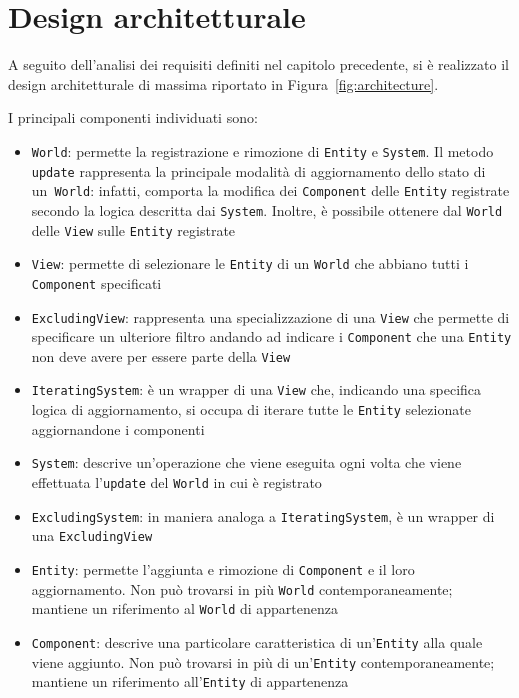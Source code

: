 \chapter{Design architetturale}\label{ch:design-architetturale}
A seguito dell'analisi dei requisiti definiti nel capitolo precedente, si è realizzato il design architetturale
di massima riportato in Figura~\ref{fig:architecture}.

I principali componenti individuati sono:
\begin{itemize}
    \item \texttt{World}: permette la registrazione e rimozione di \texttt{Entity} e \texttt{System}.
    Il metodo \texttt{update} rappresenta la principale modalità di aggiornamento dello stato di un~\texttt{World}: infatti, comporta la modifica dei \texttt{Component} delle \texttt{Entity} registrate secondo la logica descritta dai \texttt{System}.
    Inoltre, è possibile ottenere dal \texttt{World} delle \texttt{View} sulle \texttt{Entity} registrate
    \item \texttt{View}: permette di selezionare le \texttt{Entity} di un \texttt{World} che abbiano tutti i \texttt{Component} specificati
    \item \texttt{ExcludingView}: rappresenta una specializzazione di una \texttt{View} che permette di specificare un ulteriore filtro andando ad indicare i \texttt{Component} che una \texttt{Entity} non deve avere per essere parte della \texttt{View}
    \item \texttt{IteratingSystem}: è un wrapper di una \texttt{View} che, indicando una specifica logica di aggiornamento, si occupa di iterare tutte le \texttt{Entity} selezionate aggiornandone i componenti
    \item \texttt{System}: descrive un'operazione che viene eseguita ogni volta che viene effettuata l'\texttt{update} del \texttt{World} in cui è registrato
    \item \texttt{ExcludingSystem}: in maniera analoga a \texttt{IteratingSystem}, è un wrapper di una \texttt{ExcludingView}
    \item \texttt{Entity}: permette l'aggiunta e rimozione di \texttt{Component} e il loro aggiornamento.
    Non può trovarsi in più \texttt{World} contemporaneamente;
    mantiene un riferimento al \texttt{World} di appartenenza
    \item \texttt{Component}: descrive una particolare caratteristica di un'\texttt{Entity} alla quale viene aggiunto.
    Non può trovarsi in più di un'\texttt{Entity} contemporaneamente;
    mantiene un riferimento all'\texttt{Entity} di appartenenza
\end{itemize}

